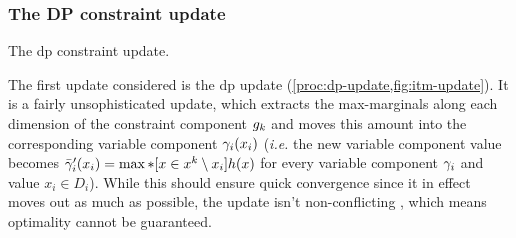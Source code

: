 \subsubsection{The DP constraint update}
\begin{algorithm}[t]

	\caption{
		The \gls{dp} constraint update.
	}
	\label{proc:dp-update}
\end{algorithm}
The first update considered is the \gls{dp} update (\cref{proc:dp-update,fig:itm-update}).
It is a fairly unsophisticated update, which extracts the max-marginals along each dimension of the constraint component \(g_k\) and moves this amount into the corresponding variable component \(\gamma_i(x_i)\) (\emph{i.e.} the new variable component value becomes \(\bar{\gamma}'_i(x_i) = \max*[x\in x^k\setminus x_i]{h(x)}\) for every variable component \(\gamma_i\) and value \(x_i\in D_i\)).
While this should ensure quick convergence since it in effect moves out as much as possible, the update isn't non-conflicting \parencite[\pno~105]{Wedelin08}, which means optimality cannot be guaranteed.

